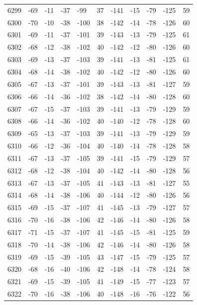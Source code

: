 \begin{table}[H]
\begin{tabular}{lllllllllll}
6299 & -69 & -11 & -37 & -99 & 37 & -141 & -15 & -79 & -125 & 59 \\
6300 & -70 & -10 & -38 & -100 & 38 & -142 & -14 & -78 & -126 & 60 \\
6301 & -69 & -11 & -37 & -101 & 39 & -143 & -13 & -79 & -125 & 61 \\
6302 & -68 & -12 & -38 & -102 & 40 & -142 & -12 & -80 & -126 & 60 \\
6303 & -69 & -13 & -37 & -103 & 39 & -141 & -13 & -81 & -125 & 61 \\
6304 & -68 & -14 & -38 & -102 & 40 & -142 & -12 & -80 & -126 & 60 \\
6305 & -67 & -13 & -37 & -101 & 39 & -143 & -13 & -81 & -127 & 59 \\
6306 & -66 & -14 & -36 & -102 & 38 & -142 & -14 & -80 & -128 & 60 \\
6307 & -67 & -15 & -37 & -103 & 39 & -141 & -13 & -79 & -129 & 59 \\
6308 & -66 & -14 & -36 & -102 & 40 & -140 & -12 & -78 & -128 & 60 \\
6309 & -65 & -13 & -37 & -103 & 39 & -141 & -13 & -79 & -129 & 59 \\
6310 & -66 & -12 & -36 & -104 & 40 & -140 & -14 & -78 & -128 & 58 \\
6311 & -67 & -13 & -37 & -105 & 39 & -141 & -15 & -79 & -129 & 57 \\
6312 & -68 & -12 & -38 & -104 & 40 & -142 & -14 & -80 & -128 & 56 \\
6313 & -67 & -13 & -37 & -105 & 41 & -143 & -13 & -81 & -127 & 55 \\
6314 & -68 & -14 & -38 & -106 & 40 & -144 & -12 & -80 & -126 & 56 \\
6315 & -69 & -15 & -37 & -107 & 41 & -145 & -13 & -79 & -127 & 57 \\
6316 & -70 & -16 & -38 & -106 & 42 & -146 & -14 & -80 & -126 & 58 \\
6317 & -71 & -15 & -37 & -107 & 41 & -145 & -15 & -81 & -125 & 59 \\
6318 & -70 & -14 & -38 & -106 & 42 & -146 & -14 & -80 & -126 & 58 \\
6319 & -69 & -15 & -39 & -105 & 43 & -147 & -15 & -79 & -125 & 57 \\
6320 & -68 & -16 & -40 & -106 & 42 & -148 & -14 & -78 & -124 & 58 \\
6321 & -69 & -15 & -39 & -105 & 41 & -149 & -15 & -77 & -123 & 57 \\
6322 & -70 & -16 & -38 & -106 & 40 & -148 & -16 & -76 & -122 & 56 \\

\end{tabular}
\end{table}
